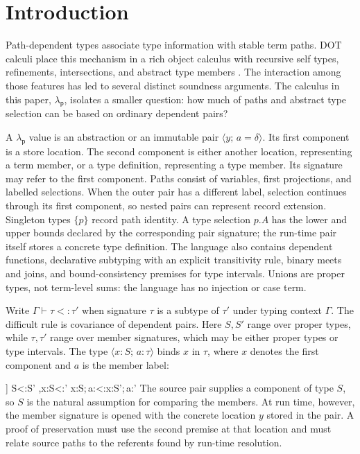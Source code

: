 \documentclass[acmsmall,screen,nonacm]{acmart}
\newcommand{\ruleuse}[1]{%
  \hyperref[rule:#1]{\textsc{#1}}}
\newcommand{\lambdap}{\ensuremath{\lambda_{\mathsf p}}}
\newcommand{\sing}[1]{\{#1\}}
\newcommand{\pairty}[4]{\langle #1\!:\!#2;\,#3\!:\!#4\rangle}
\newcommand{\pairval}[3]{\langle #1;\,#2=#3\rangle}
\newcommand{\rulesetup}{%
  \small
  \smallrulenames
  \setlength{\afterruleskip}{2em plus 0.2em minus 0.1em}%
  \setlength{\labelminsep}{0.6em}%
  \renewcommand{\arraystretch}{1.15}%
  \renewcommand{\andalso}{\qquad}%
}
\begin{document}
\maketitle

\section{Introduction}

Path-dependent types associate type information with stable term paths. DOT
calculi place this mechanism in a rich object calculus with recursive self
types, refinements, intersections, and abstract type members
\citep{amin2014foundations,rompf2016dot}. The interaction among those
features has led to several distinct soundness arguments. The calculus in
this paper, \lambdap{}, isolates a smaller question: how much of paths and
abstract type selection can be based on ordinary dependent pairs?

A \lambdap{} value is an abstraction or an immutable pair
\(\pairval{y}{a}{\delta}\). Its first component is a store location. The
second component is either another location, representing a term member, or
a type definition, representing a type member. Its signature may refer to the
first component. Paths consist of variables, first projections, and labelled
selections. When the outer pair has a different label, selection continues
through its first component, so nested pairs can represent record extension.
Singleton types \(\sing{p}\) record path identity. A type selection \(p.A\)
has the lower and upper bounds declared by the corresponding pair signature;
the run-time pair itself stores a concrete type definition. The language also
contains dependent functions, declarative subtyping with an explicit
transitivity rule, binary meets and joins, and bound-consistency premises for
type intervals. Unions are proper types, not term-level sums: the language has
no injection or case term.

Write \(\Gamma\vdash\tau<:\tau'\) when signature \(\tau\) is a subtype of
\(\tau'\) under typing context \(\Gamma\). The difficult rule is covariance
of dependent pairs. Here \(S,S'\) range over proper types, while
\(\tau,\tau'\) range over member signatures, which may be either proper
types or type intervals. The type \(\pairty{x}{S}{a}{\tau}\) binds \(x\) in
\(\tau\), where \(x\) denotes the first component and \(a\) is the member
label:
\begingroup
\rulesetup
{}
\infrule[\ruleuse{s-pair}]
  {\Gamma\vdash S<:S'
   \andalso
   \Gamma,x:S\vdash \tau<:\tau'}
  {\Gamma\vdash
    \pairty{x}{S}{a}{\tau}<:\pairty{x}{S'}{a}{\tau'}}
\endgroup
The source pair supplies a component of type \(S\), so \(S\) is the natural
assumption for comparing the members. At run time, however, the member
signature is opened with the concrete location \(y\) stored in the pair. A
proof of preservation must use the second premise at that location and must
relate source paths to the referents found by run-time resolution.
\end{document}
